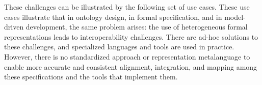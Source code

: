 \documentclass[10pt,%
\ifpretendfinal
final%
\else
draft%
\fi,
]{scrreprt}
\begin{document}
These challenges can be illustrated by the following set of use cases.
These use cases illustrate that in ontology design, in formal
specification, and in model-driven development, the same problem
arises: the use of heterogeneous formal representations leads to
interoperability challenges. There are ad-hoc solutions to these
challenges, and specialized languages and tools are used in
practice. However, there is no standardized approach or representation
metalanguage to enable more accurate and consistent alignment,
integration, and mapping among these specifications and the tools that
implement them.



%
\end{document}
